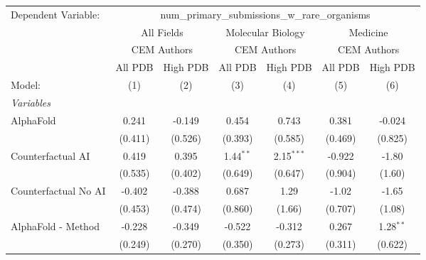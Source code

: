 \begingroup
\centering
\begin{tabular}{lcccccc}
   \tabularnewline \midrule \midrule
   Dependent Variable: & \multicolumn{6}{c}{num\_primary\_submissions\_w\_rare\_organisms}\\
 & \multicolumn{2}{c}{All Fields} & \multicolumn{2}{c}{Molecular Biology} & \multicolumn{2}{c}{Medicine} \\
\cmidrule(lr){2-3} \cmidrule(lr){4-5} \cmidrule(lr){6-7}
 & \multicolumn{2}{c}{CEM Authors} & \multicolumn{2}{c}{CEM Authors} & \multicolumn{2}{c}{CEM Authors} \\
\cmidrule(lr){2-3} \cmidrule(lr){4-5} \cmidrule(lr){6-7}
 & \multicolumn{1}{c}{All PDB} & \multicolumn{1}{c}{High PDB} & \multicolumn{1}{c}{All PDB} & \multicolumn{1}{c}{High PDB} & \multicolumn{1}{c}{All PDB} & \multicolumn{1}{c}{High PDB} \\
\cmidrule(lr){2-2} \cmidrule(lr){3-3} \cmidrule(lr){4-4} \cmidrule(lr){5-5} \cmidrule(lr){6-6} \cmidrule(lr){7-7}
   Model:                                                     & (1)     & (2)         & (3)           & (4)           & (5)         & (6)\\  
   \midrule
   \emph{Variables}\\
   AlphaFold                                                  & 0.241   & -0.149      & 0.454         & 0.743         & 0.381       & -0.024\\   
                                                              & (0.411) & (0.526)     & (0.393)       & (0.585)       & (0.469)     & (0.825)\\   
   Counterfactual AI                                          & 0.419   & 0.395       & 1.44$^{**}$   & 2.15$^{***}$  & -0.922      & -1.80\\   
                                                              & (0.535) & (0.402)     & (0.649)       & (0.647)       & (0.904)     & (1.60)\\   
   Counterfactual No AI                                       & -0.402  & -0.388      & 0.687         & 1.29          & -1.02       & -1.65\\   
                                                              & (0.453) & (0.474)     & (0.860)       & (1.66)        & (0.707)     & (1.08)\\   
   AlphaFold - Method                                         & -0.228  & -0.349      & -0.522        & -0.312        & 0.267       & 1.28$^{**}$\\   
                                                              & (0.249) & (0.270)     & (0.350)       & (0.273)       & (0.311)     & (0.622)\\   

\end{tabular}
